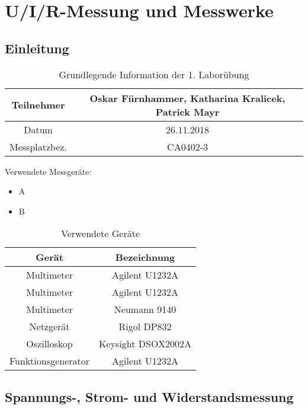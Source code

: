 \chapter{U/I/R-Messung und Messwerke}
\section{Einleitung}

\begin{table}[h]
	\centering
	\begin{tabular}{|c|c|}
		\hline 
		Teilnehmer 		& Oskar Fürnhammer, Katharina Kralicek, Patrick Mayr \\
		\hline 
		Datum 		& 26.11.2018 \\ 
		\hline 
		Messplatzbez. 	& CA0402-3 \\
		\hline
	\end{tabular} 
	\caption{Grundlegende Information der 1. Laborübung}
\end{table}

Verwendete Messgeräte:
\begin{itemize}
	\item{A}
	\item{B}
\end{itemize}


\begin{table}[h]
	\centering
	\begin{tabular}{ c | c }

Gerät				& Bezeichnung		\\
\hline

Multimeter			& Agilent U1232A 		\\
Multimeter			& Agilent U1232A 		\\
Multimeter			& Neumann 9140	 	\\
Netzgerät			& Rigol DP832 		\\
Oszilloskop			& Keysight DSOX2002A 	\\
Funktionsgenerator		& Agilent U1232A 		\\

	\end{tabular}

	\caption{Verwendete Geräte}

\end{table}

\newpage

\section{Spannungs-, Strom- und Widerstandsmessung}

